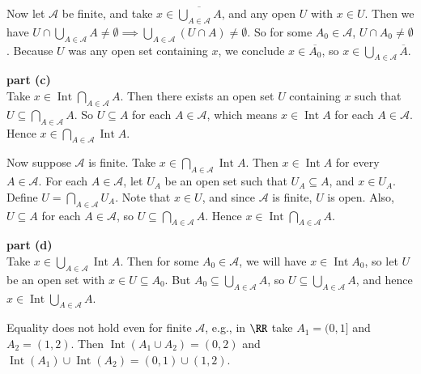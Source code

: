 \documentclass{homework}
\newcommand{\calA}{\mathcal{A}}
\DeclareMathOperator{\Int}{\mathrm{Int}}
\begin{document}
Now let $\calA$ be finite, and take $x\in\overline{\bigcup_{A\in\calA} A}$,
and any open $U$ with $x\in U$.  Then we have
$U\cap \bigcup_{A\in\calA} A\ne\emptyset \implies
\bigcup_{A\in\calA} (U\cap A)\ne\emptyset$.  So for some $A_0\in\calA$, $U\cap A_0\ne\emptyset$.
Because $U$ was any open set containing $x$, we conclude $x\in\overline{A_0}$, so $x\in\bigcup_{A\in\calA} \overline{A}$.

\textbf{part (c)}\\
Take $x\in\Int\bigcap_{A\in\calA} A$.  Then there exists an open set $U$ containing
$x$ such that $U\subseteq \bigcap_{A\in\calA} A$.  So $U\subseteq A$ for each $A\in\calA$,
which means $x\in\Int A$ for each $A\in\calA$.  Hence $x\in\bigcap_{A\in\calA}\Int A$.

Now suppose $\calA$ is finite.
Take $x\in\bigcap_{A\in\calA}\Int A$.  Then $x\in\Int A$ for every $A\in\calA$. 
For each $A\in\calA$, let $U_A$ be an open set such that $U_A\subseteq A$,
and $x\in U_A$.  Define $U=\bigcap_{A\in\calA} U_A$.
Note that $x\in U$, and since $\calA$ is finite, $U$ is open.
Also, $U\subseteq A$ for
each $A\in\calA$, so $U\subseteq\bigcap_{A\in\calA} A$.
Hence $x\in\Int\bigcap_{A\in\calA} A$.

\textbf{part (d)}\\
Take $x\in\bigcup_{A\in\calA}\Int A$.  Then for some $A_0\in\calA$, we will
have $x\in\Int A_0$, so let $U$ be an open set with $x\in U\subseteq A_0$.
But $A_0\subseteq \bigcup_{A\in\calA} A$, so $U\subseteq \bigcup_{A\in\calA} A$,
and hence $x\in\Int \bigcup_{A\in\calA} A$.

Equality does not hold even for finite $\calA$, e.g., in $\RR$
take $A_1=(0,1]$ and $A_2=(1,2)$. Then $\Int(A_1\cup A_2)=(0,2)$ and
$\Int(A_1)\cup\Int(A_2)=(0,1)\cup(1,2)$.
\end{document}
